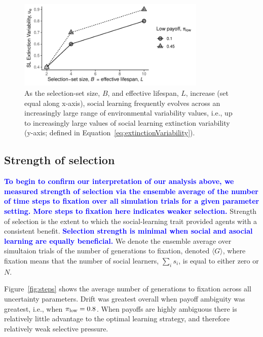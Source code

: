 \documentclass[letterpaper,11.5pt]{scrartcl}
\newcommand{\edit}[1]{{\bfseries \textcolor{blue} {#1}}}
\begin{document}
\begin{figure}
  \caption{As the selection-set size, $B$, and effective lifespan, $L$, increase (set equal along x-axis), 
  social learning frequently evolves across an increasingly large range of
  environmental variability values, i.e., up to
  increasingly large values of social learning extinction variability
(y-axis; defined in Equation~\ref{eq:extinctionVariability}).}
  \label{fig:extinctionVariability}
  \centering
    \includegraphics[width=0.8\textwidth]{Figures/SL_Extinction_Variability.pdf}
\end{figure}


\subsection{Strength of selection}

\edit{To begin to confirm our interpretation of our analysis above, we measured
  strength of selection via the ensemble average of the number of
time steps to fixation over all simulation trials for a given parameter setting. More steps to fixation here indicates weaker selection.} Strength of selection is the extent to which the
social-learning trait provided agents with a consistent benefit. \edit{Selection
  strength is minimal when social and asocial learning
are equally beneficial.} 
We denote the ensemble average over simultaion trials of the number of generations to fixation, denoted $\langle G \rangle$, where fixation means that the number of social learners, $\sum_i s_i$, is equal to either zero or $N$. %

Figure~\ref{fig:steps} shows the average number of generations to fixation across all uncertainty parameters. Drift was greatest overall when payoff ambiguity was greatest, i.e., when $\pi_{\mathrm{low}} = 0.8$. When payoffs are highly ambiguous there is relatively little advantage to the optimal learning strategy, and therefore relatively weak selective pressure.
\end{document}

